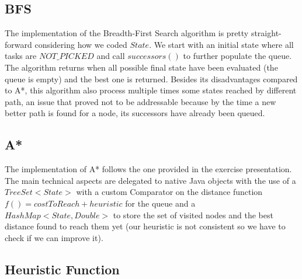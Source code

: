 \documentclass[11pt]{article}
\begin{document}
\subsection{BFS}
The implementation of the Breadth-First Search algorithm is pretty straight-forward considering how we coded $State$. We start with an initial state where all tasks are $NOT\_PICKED$ and call $successors()$ to further populate the queue. The algorithm returns when all possible final state have been evaluated (the queue is empty) and the best one is returned. Besides its disadvantages compared to A*, this algorithm also process multiple times some states reached by different path, an issue that proved not to be addressable because by the time a new better path is found for a node, its successors have already been queued.    

\subsection{A*}
The implementation of A* follows the one provided in the exercise presentation. The main technical aspects are delegated to native Java objects with the use of a $TreeSet<State>$ with a custom Comparator on the distance function $f()=costToReach+heuristic$ for the queue and a $HashMap<State,Double>$ to store the set of visited nodes and the best distance found to reach them yet (our heuristic is not consistent so we have to check if we can improve it).


\subsection{Heuristic Function}
\end{document}
